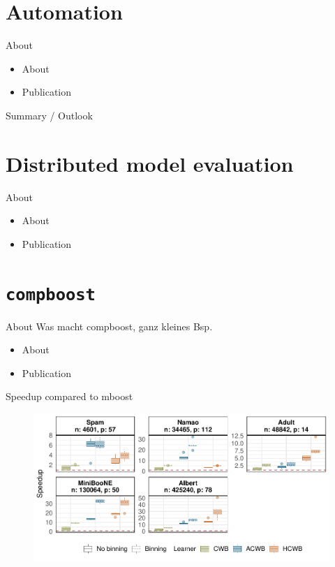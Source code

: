 \documentclass[t,10pt]{beamer}
\begin{document}


\section{Automation}

\begin{frame}{About}
  \begin{itemize}
    \item About
    \item Publication
  \end{itemize}
\end{frame}

\begin{frame}{Summary / Outlook}
\end{frame}

\section{Distributed model evaluation}

\begin{frame}{About}
  \begin{itemize}
    \item About
    \item Publication
  \end{itemize}
\end{frame}

\section{\texttt{compboost}}

\begin{frame}{About}
  Was macht compboost, ganz kleines Bsp.
  \begin{itemize}
    \item About
    \item Publication
  \end{itemize}
\end{frame}

\begin{frame}{Speedup compared to mboost}
  \begin{figure}
    \centering
    \includegraphics[width=\textwidth]{figures/fig-cacb-mboost-comparison.pdf}
  \end{figure}
\end{frame}
\end{document}
